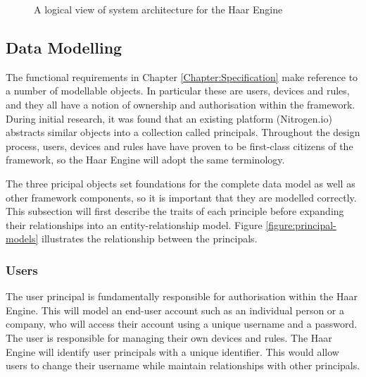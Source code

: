     \begin{figure}
    \centering
    \caption{A logical view of system architecture for the Haar Engine}\label{figure:framework-architecture}
  \end{figure}

    \subsection{Data Modelling}
      The functional requirements in Chapter \ref{Chapter:Specification} make reference to a number of modellable objects. In particular these are users, devices and rules, and they all have a notion of ownership and authorisation within the framework. During initial research, it was found that an existing platform (Nitrogen.io) abstracts similar objects into a collection called principals. Throughout the design process, users, devices and rules have have proven to be first-class citizens of the framework, so the Haar Engine will adopt the same terminology.

      The three pricipal objects set foundations for the complete data model as well as other framework components, so it is important that they are modelled correctly. This subsection will first describe the traits of each principle before expanding their relationships into an entity-relationship model. Figure \ref{figure:principal-models} illustrates the relationship between the principals.

      \subsubsection{Users}
        The user principal is fundamentally responsible for authorisation within the Haar Engine. This will model an end-user account such as an individual person or a company, who will access their account using a unique username and a password. The user is responsible for managing their own devices and rules. The Haar Engine will identify user principals with a unique identifier. This would allow users to change their username while maintain relationships with other principals.

